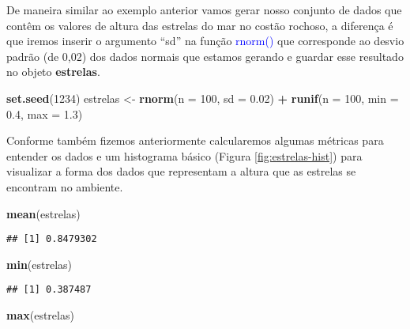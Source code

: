 \documentclass[14pt,titlepage, oneside, openany, a4paper]{book}
\newenvironment{Shaded}{\begin{snugshade}}{\end{snugshade}}
\newcommand{\DataTypeTok}[1]{\textcolor[rgb]{0.13,0.29,0.53}{#1}}
\newcommand{\DecValTok}[1]{\textcolor[rgb]{0.00,0.00,0.81}{#1}}
\newcommand{\FloatTok}[1]{\textcolor[rgb]{0.00,0.00,0.81}{#1}}
\newcommand{\KeywordTok}[1]{\textcolor[rgb]{0.13,0.29,0.53}{\textbf{#1}}}
\newcommand{\NormalTok}[1]{#1}
\newcommand{\OperatorTok}[1]{\textcolor[rgb]{0.81,0.36,0.00}{\textbf{#1}}}
\newcommand{\StringTok}[1]{\textcolor[rgb]{0.31,0.60,0.02}{#1}}
\begin{document}
De maneira similar ao exemplo anterior vamos gerar nosso conjunto de dados que contêm os valores de altura das estrelas do mar no costão rochoso, a diferença é que iremos inserir o argumento ``sd'' na função \textcolor{blue}{rnorm()} que corresponde ao desvio padrão (de 0,02) dos dados normais que estamos gerando e guardar esse resultado no objeto \textbf{estrelas}.

\begin{Shaded}
\begin{Highlighting}[]
\KeywordTok{set.seed}\NormalTok{(}\DecValTok{1234}\NormalTok{)}
\NormalTok{estrelas <-}\StringTok{ }\KeywordTok{rnorm}\NormalTok{(}\DataTypeTok{n =} \DecValTok{100}\NormalTok{, }\DataTypeTok{sd =} \FloatTok{0.02}\NormalTok{) }\OperatorTok{+}\StringTok{ }\KeywordTok{runif}\NormalTok{(}\DataTypeTok{n =} \DecValTok{100}\NormalTok{, }\DataTypeTok{min =} \FloatTok{0.4}\NormalTok{, }\DataTypeTok{max =} \FloatTok{1.3}\NormalTok{)}
\end{Highlighting}
\end{Shaded}

Conforme também fizemos anteriormente calcularemos algumas métricas para entender os dados e um histograma básico (Figura \ref{fig:estrelas-hist}) para visualizar a forma dos dados que representam a altura que as estrelas se encontram no ambiente.

\begin{Shaded}
\begin{Highlighting}[]
\KeywordTok{mean}\NormalTok{(estrelas)}
\end{Highlighting}
\end{Shaded}

\begin{verbatim}
## [1] 0.8479302
\end{verbatim}

\begin{Shaded}
\begin{Highlighting}[]
\KeywordTok{min}\NormalTok{(estrelas)}
\end{Highlighting}
\end{Shaded}

\begin{verbatim}
## [1] 0.387487
\end{verbatim}

\begin{Shaded}
\begin{Highlighting}[]
\KeywordTok{max}\NormalTok{(estrelas)}
\end{Highlighting}
\end{Shaded}
\end{document}
